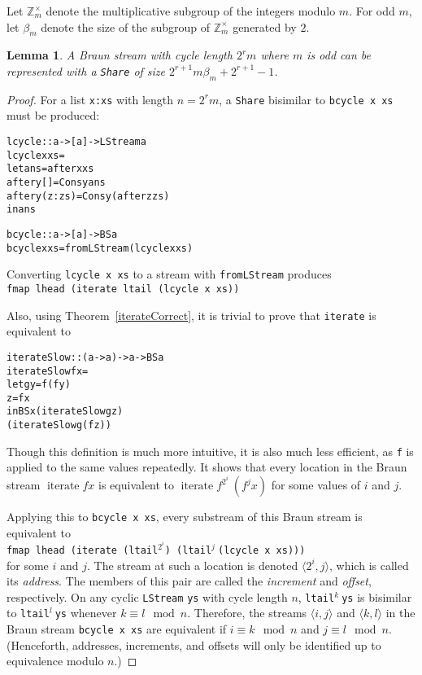 \documentclass[envcountsect]{llncs}
\DeclareMathOperator{\iter}{iterate}
\newcommand{\share}{{\tt Share} }
\newtheorem{lemma}[theorem]{Lemma}
\begin{document}
Let $\mathbb{Z}_m^{\times}$ denote the multiplicative subgroup of the integers modulo $m$.
For odd $m$, let $\beta_m$ denote the size of the subgroup of $\mathbb{Z}_m^{\times}$ generated by $2$.
\begin{lemma}
\label{cycleSize}
A Braun stream with cycle length $2^r m$ where $m$ is odd can be represented with a \share of size $2^{r+1} m \beta_m + 2^{r+1} - 1$.
\end{lemma}
\begin{proof}
For a list {\tt x:xs} with length $n = 2^r m$, a \share bisimilar to {\tt bcycle x xs} must be produced:

\begin{alltt}
lcycle :: a -> [a] -> LStream a
lcycle x xs = 
  let ans = after x xs
      after y [] = Cons y ans
      after y (z:zs) = Cons y (after z zs)
  in ans

bcycle :: a -> [a] -> BS a
bcycle x xs = fromLStream (lcycle x xs)
\end{alltt}

Converting {\tt lcycle x xs} to a stream with {\tt fromLStream} produces 
\\
{\tt fmap lhead (iterate ltail (lcycle x xs))}

Also, using Theorem~\ref{iterateCorrect}, it is trivial to prove that {\tt iterate} is equivalent to

\begin{alltt}
iterateSlow :: (a -> a) -> a -> BS a
iterateSlow f x =
  let g y = f (f y)
      z = f x
  in BS x (iterateSlow g    z) 
          (iterateSlow g (f z))
\end{alltt}

Though this definition is much more intuitive, it is also much less efficient, as {\tt f} is applied to the same values repeatedly.
It shows that every location in the Braun stream $\iter f x$ is equivalent to $\iter f^{2^i}\ (f^j x)$ for some values of $i$ and $j$.

Applying this to {\tt bcycle x xs}, every substream of this Braun stream is equivalent to 
\\
{\tt fmap lhead (iterate (ltail}$^{2^i}${\tt ) (ltail}$^j\ ${\tt (lcycle x xs)))} 
\\
for some $i$ and $j$.
The stream at such a location is denoted $\langle 2^i,j \rangle$, which is called its {\em address}.
The members of this pair are called the {\em increment} and {\em offset}, respectively.
On any cyclic {\tt LStream} {\tt ys} with cycle length $n$, {\tt ltail}$^k\ ${\tt ys} is bisimilar to {\tt ltail}$^l\ ${\tt ys} whenever $k \equiv l \mod n$.
Therefore, the streams $\langle i,j \rangle$ and $\langle k,l \rangle$ in the Braun stream {\tt bcycle x xs} are equivalent if $i \equiv k \mod n$ and $j \equiv l \mod n$.
(Henceforth, addresses, increments, and offsets will only be identified up to equivalence modulo $n$.)



\end{proof}
\end{document}
